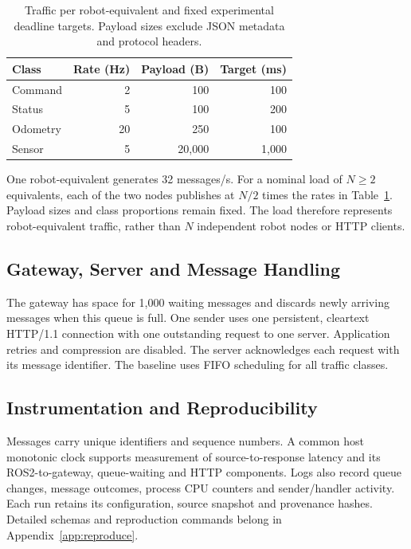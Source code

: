 \documentclass[10pt,a4paper,twocolumn,twoside]{tau-class/tau}
\begin{document}
\begin{table}[tbp]
    \centering
    \caption{Traffic per robot-equivalent and fixed experimental deadline
    targets. Payload sizes exclude JSON metadata and protocol headers.}
    \label{tab:traffic}
    \small
    \begin{tabular}{lrrr}
        \toprule
        Class & Rate (Hz) & Payload (B) & Target (ms) \\
        \midrule
        Command  & 2  & 100    & 100 \\
        Status   & 5  & 100    & 200 \\
        Odometry & 20 & 250    & 100 \\
        Sensor   & 5  & 20,000 & 1,000 \\
        \bottomrule
    \end{tabular}
\end{table}

One robot-equivalent generates 32 messages/s. For a nominal load of
$N\geq2$ equivalents, each of the two nodes publishes at $N/2$ times the
rates in Table~\ref{tab:traffic}. Payload sizes and class proportions remain
fixed. The load therefore represents robot-equivalent traffic, rather than
$N$ independent robot nodes or HTTP clients.

\subsection{Gateway, Server and Message Handling}
The gateway has space for 1,000 waiting messages and discards newly arriving
messages when this queue is full. One sender uses one persistent, cleartext
HTTP/1.1 connection with one outstanding request to one server. Application
retries and compression are disabled. The server acknowledges each request
with its message identifier. The baseline uses FIFO scheduling for all
traffic classes.

\subsection{Instrumentation and Reproducibility}
Messages carry unique identifiers and sequence numbers. A common host
monotonic clock supports measurement of source-to-response latency and its
ROS2-to-gateway, queue-waiting and HTTP components. Logs also record queue
changes, message outcomes, process CPU counters and sender/handler activity.
Each run retains its configuration, source snapshot and provenance hashes.
Detailed schemas and reproduction commands belong in
Appendix~\ref{app:reproduce}.
\end{document}
